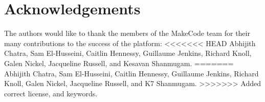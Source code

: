 \documentclass[sigplan]{acmart}
\begin{document}
    



    \maketitle

    \renewcommand{\shortauthors}{J. Devine, J. Finney, M. Moskal, P. Halleux, T. Ball, S. Hodges}

    
    
    
    
    
    
    

    \section*{Acknowledgements}

    The authors would like to thank the members of the MakeCode
    team for their many contributions to the success of the platform:
<<<<<<< HEAD
    Abhijith Chatra, Sam El-Husseini, Caitlin Hennessy, Guillaume Jenkins, 
    Richard Knoll, Galen Nickel, Jacqueline Russell, and Kesavan Shanmugam.
=======
    Abhijith Chatra, Sam El-Husseini, Caitlin Hennessy, Guillaume Jenkins,
    Richard Knoll, Galen Nickel, Jacqueline Russell, and K7 Shanmugam.
>>>>>>> Added correct license, and keywords.


    

    

    
\end{document}
